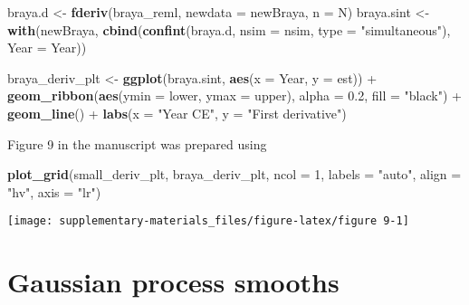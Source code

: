 \documentclass[12pt,]{article}
\newenvironment{Shaded}{\begin{snugshade}}{\end{snugshade}}
\newcommand{\KeywordTok}[1]{\textcolor[rgb]{0.13,0.29,0.53}{\textbf{{#1}}}}
\newcommand{\DataTypeTok}[1]{\textcolor[rgb]{0.13,0.29,0.53}{{#1}}}
\newcommand{\DecValTok}[1]{\textcolor[rgb]{0.00,0.00,0.81}{{#1}}}
\newcommand{\FloatTok}[1]{\textcolor[rgb]{0.00,0.00,0.81}{{#1}}}
\newcommand{\StringTok}[1]{\textcolor[rgb]{0.31,0.60,0.02}{{#1}}}
\newcommand{\NormalTok}[1]{{#1}}
\begin{document}
\begin{Shaded}
\begin{Highlighting}[]
\NormalTok{braya.d <-}\StringTok{ }\KeywordTok{fderiv}\NormalTok{(braya_reml, }\DataTypeTok{newdata =} \NormalTok{newBraya, }\DataTypeTok{n =} \NormalTok{N)}
\NormalTok{braya.sint <-}\StringTok{ }\KeywordTok{with}\NormalTok{(newBraya,}
                   \KeywordTok{cbind}\NormalTok{(}\KeywordTok{confint}\NormalTok{(braya.d, }\DataTypeTok{nsim =} \NormalTok{nsim,}
                                 \DataTypeTok{type =} \StringTok{"simultaneous"}\NormalTok{),}
                         \DataTypeTok{Year =} \NormalTok{Year))}

\NormalTok{braya_deriv_plt <-}\StringTok{ }\KeywordTok{ggplot}\NormalTok{(braya.sint, }\KeywordTok{aes}\NormalTok{(}\DataTypeTok{x =} \NormalTok{Year, }\DataTypeTok{y =} \NormalTok{est)) +}
\StringTok{    }\KeywordTok{geom_ribbon}\NormalTok{(}\KeywordTok{aes}\NormalTok{(}\DataTypeTok{ymin =} \NormalTok{lower, }\DataTypeTok{ymax =} \NormalTok{upper),}
                \DataTypeTok{alpha =} \FloatTok{0.2}\NormalTok{, }\DataTypeTok{fill =} \StringTok{"black"}\NormalTok{) +}
\StringTok{    }\KeywordTok{geom_line}\NormalTok{() +}
\StringTok{    }\KeywordTok{labs}\NormalTok{(}\DataTypeTok{x =} \StringTok{"Year CE"}\NormalTok{, }\DataTypeTok{y =} \StringTok{"First derivative"}\NormalTok{)}
\end{Highlighting}
\end{Shaded}

Figure 9 in the manuscript was prepared using

\begin{Shaded}
\begin{Highlighting}[]
\KeywordTok{plot_grid}\NormalTok{(small_deriv_plt, braya_deriv_plt, }\DataTypeTok{ncol =} \DecValTok{1}\NormalTok{, }\DataTypeTok{labels =} \StringTok{"auto"}\NormalTok{,}
          \DataTypeTok{align =} \StringTok{"hv"}\NormalTok{, }\DataTypeTok{axis =} \StringTok{"lr"}\NormalTok{)}
\end{Highlighting}
\end{Shaded}

\begin{center}\texttt{[image: supplementary-materials\_files/figure-latex/figure 9-1]} \end{center}

\section{Gaussian process smooths}\label{gaussian-process-smooths}
\end{document}
